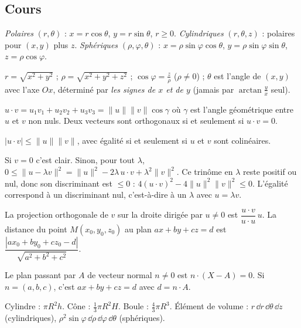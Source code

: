 \subsection{Cours}
\begin{definition}[Coordonnées]
\emph{Polaires} $(r,\theta)$ : $x=r\cos\theta$, $y=r\sin\theta$, $r\ge0$. \emph{Cylindriques} $(r,\theta,z)$ : polaires pour $(x,y)$ plus $z$. \emph{Sphériques} $(\rho,\varphi,\theta)$ : $x=\rho\sin\varphi\cos\theta$, $y=\rho\sin\varphi\sin\theta$, $z=\rho\cos\varphi$.
\end{definition}
\begin{propriete}
$r=\sqrt{x^2+y^2}$ ; $\rho=\sqrt{x^2+y^2+z^2}$ ; $\cos\varphi=\frac z\rho$ ($\rho\ne0$) ; $\theta$ est l'angle de $(x,y)$ avec l'axe $Ox$, déterminé par \emph{les signes de $x$ et de $y$} (jamais par $\arctan\frac yx$ seul).
\end{propriete}
\begin{definition}
$u\cdot v=u_1v_1+u_2v_2+u_3v_3=\|u\|\|v\|\cos\gamma$ où $\gamma$ est l'angle géométrique entre $u$ et $v$ non nuls. Deux vecteurs sont orthogonaux si et seulement si $u\cdot v=0$.
\end{definition}
\begin{propriete}
$|u\cdot v|\le\|u\|\|v\|$, avec égalité si et seulement si $u$ et $v$ sont colinéaires.
\end{propriete}
\begin{demonstration}
Si $v=0$ c'est clair. Sinon, pour tout $\lambda$, $0\le\|u-\lambda v\|^2=\|u\|^2-2\lambda\,u\cdot v+\lambda^2\|v\|^2$. Ce trinôme en $\lambda$ reste positif ou nul, donc son discriminant est $\le0$ : $4(u\cdot v)^2-4\|u\|^2\|v\|^2\le0$. L'égalité correspond à un discriminant nul, c'est-à-dire à un $\lambda$ avec $u=\lambda v$.
\end{demonstration}
\begin{propriete}
La projection orthogonale de $v$ sur la droite dirigée par $u\ne0$ est $\dfrac{u\cdot v}{u\cdot u}\,u$. La distance du point $M(x_0,y_0,z_0)$ au plan $ax+by+cz=d$ est $\dfrac{|ax_0+by_0+cz_0-d|}{\sqrt{a^2+b^2+c^2}}$.
\end{propriete}
\begin{propriete}
Le plan passant par $A$ de vecteur normal $n\ne0$ est $n\cdot(X-A)=0$. Si $n=(a,b,c)$, c'est $ax+by+cz=d$ avec $d=n\cdot A$.
\end{propriete}
\begin{propriete}
Cylindre : $\pi R^2h$. Cône : $\frac13\pi R^2H$. Boule : $\frac43\pi R^3$. Élément de volume : $r\,\dd r\,\dd\theta\,\dd z$ (cylindriques), $\rho^2\sin\varphi\,\dd\rho\,\dd\varphi\,\dd\theta$ (sphériques).
\end{propriete}
